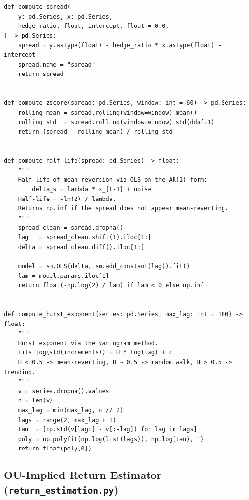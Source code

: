 \documentclass[a4paper]{report}
\begin{document}
\begin{Verbatim}[fontsize=\footnotesize, baselinestretch=0.85]
def compute_spread(
    y: pd.Series, x: pd.Series,
    hedge_ratio: float, intercept: float = 0.0,
) -> pd.Series:
    spread = y.astype(float) - hedge_ratio * x.astype(float) - intercept
    spread.name = "spread"
    return spread


def compute_zscore(spread: pd.Series, window: int = 60) -> pd.Series:
    rolling_mean = spread.rolling(window=window).mean()
    rolling_std  = spread.rolling(window=window).std(ddof=1)
    return (spread - rolling_mean) / rolling_std


def compute_half_life(spread: pd.Series) -> float:
    """
    Half-life of mean reversion via OLS on the AR(1) form:
        delta_s = lambda * s_{t-1} + noise
    Half-life = -ln(2) / lambda.
    Returns np.inf if the spread does not appear mean-reverting.
    """
    spread_clean = spread.dropna()
    lag   = spread_clean.shift(1).iloc[1:]
    delta = spread_clean.diff().iloc[1:]

    model = sm.OLS(delta, sm.add_constant(lag)).fit()
    lam = model.params.iloc[1]
    return float(-np.log(2) / lam) if lam < 0 else np.inf


def compute_hurst_exponent(series: pd.Series, max_lag: int = 100) -> float:
    """
    Hurst exponent via the variogram method.
    Fits log(std(increments)) = H * log(lag) + c.
    H < 0.5 -> mean-reverting, H ~ 0.5 -> random walk, H > 0.5 -> trending.
    """
    v = series.dropna().values
    n = len(v)
    max_lag = min(max_lag, n // 2)
    lags = range(2, max_lag + 1)
    tau  = [np.std(v[lag:] - v[:-lag]) for lag in lags]
    poly = np.polyfit(np.log(list(lags)), np.log(tau), 1)
    return float(poly[0])
\end{Verbatim}

\subsection{OU-Implied Return Estimator (\texttt{return\_estimation.py})}
\end{document}
